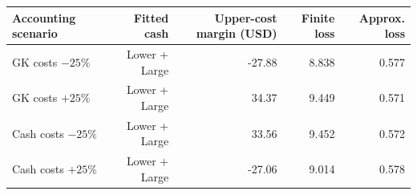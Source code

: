 \begin{tabular}{lrrrr}
\toprule
Accounting scenario & Fitted cash & Upper-cost margin (USD) & Finite loss & Approx. loss \\
\midrule
GK costs $-25\%$ & Lower + Large & -27.88 & 8.838 & 0.577 \\
GK costs $+25\%$ & Lower + Large & 34.37 & 9.449 & 0.571 \\
Cash costs $-25\%$ & Lower + Large & 33.56 & 9.452 & 0.572 \\
Cash costs $+25\%$ & Lower + Large & -27.06 & 9.014 & 0.578 \\
\bottomrule
\end{tabular}
